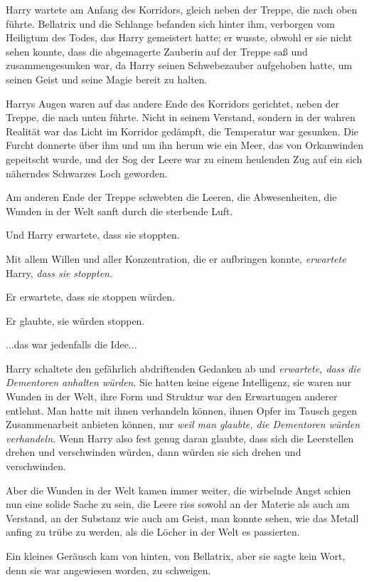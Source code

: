 {Harry wartete am Anfang des Korridors, gleich neben der Treppe, die nach oben führte. Bellatrix und die Schlange befanden sich hinter ihm, verborgen vom Heiligtum des Todes, das Harry gemeistert hatte; er wusste, obwohl er sie nicht sehen konnte, dass die abgemagerte Zauberin auf der Treppe saß und zusammengesunken war, da Harry seinen Schwebezauber aufgehoben hatte, um seinen Geist und seine Magie bereit zu halten.

Harrys Augen waren auf das andere Ende des Korridors gerichtet, neben der Treppe, die nach unten führte. Nicht in seinem Verstand, sondern in der wahren Realität war das Licht im Korridor gedämpft, die Temperatur war gesunken. Die Furcht donnerte über ihm und um ihn herum wie ein Meer, das von Orkanwinden gepeitscht wurde, und der Sog der Leere war zu einem heulenden Zug auf ein sich näherndes Schwarzes Loch geworden.

Am anderen Ende der Treppe schwebten die Leeren, die Abwesenheiten, die Wunden in der Welt sanft durch die sterbende Luft.

Und Harry erwartete, dass sie stoppten.

Mit allem Willen und aller Konzentration, die er aufbringen konnte, \emph{erwartete} Harry, \emph{dass sie} \emph{stoppten}.

Er erwartete, dass sie stoppen würden.

Er glaubte, sie würden stoppen.

...das war jedenfalls die Idee...

Harry schaltete den gefährlich abdriftenden Gedanken ab und \emph{erwartete, dass die Dementoren anhalten würden}. Sie hatten keine eigene Intelligenz, sie waren nur Wunden in der Welt, ihre Form und Struktur war den Erwartungen anderer entlehnt. Man hatte mit ihnen verhandeln können, ihnen Opfer im Tausch gegen Zusammenarbeit anbieten können, nur \emph{weil man glaubte, die Dementoren würden verhandeln.} Wenn Harry also fest genug daran glaubte, dass sich die Leerstellen drehen und verschwinden würden, dann würden sie sich drehen und verschwinden.

Aber die Wunden in der Welt kamen immer weiter, die wirbelnde Angst schien nun eine solide Sache zu sein, die Leere riss sowohl an der Materie als auch am Verstand, an der Substanz wie auch am Geist, man konnte sehen, wie das Metall anfing zu trübe zu werden, als die Löcher in der Welt es passierten.

Ein kleines Geräusch kam von hinten, von Bellatrix, aber sie sagte kein Wort, denn sie war angewiesen worden, zu schweigen.

}

